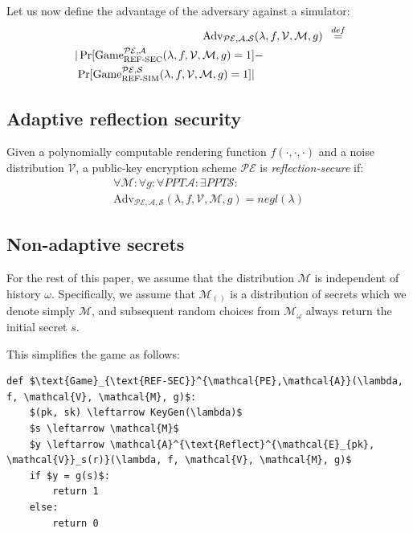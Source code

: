 \documentclass[conference, letterpaper, 10pt]{IEEEtran}
\newcommand\defeq{\stackrel{\mathclap{\normalfont\mbox{def}}}{=}}
\begin{document}
Let us now define the advantage of the adversary against a simulator:
\begin{align*}
    \text{Adv}_{\mathcal{PE}, \mathcal{A}, \mathcal{S}}&(\lambda, f, \mathcal{V}, \mathcal{M}, g) &\defeq\\
    |\Pr[\text{Game}_{\text{REF-SEC}}^{\mathcal{PE},\mathcal{A}}(\lambda, f, \mathcal{V}, \mathcal{M}, g) = 1] &-\\
    \Pr[\text{Game}_{\text{REF-SIM}}^{\mathcal{PE},\mathcal{S}}(\lambda, f, \mathcal{V}, \mathcal{M}, g) = 1]| &
\end{align*}

\subsection{Adaptive reflection security}\label{subsec:adaptiverefsec}

Given a polynomially computable rendering function $f(\cdot, \cdot, \cdot)$ and
a  noise distribution $\mathcal{V}$, a public-key encryption scheme
$\mathcal{PE}$ is \textit{reflection-secure} if:
\begin{align*}
\forall \mathcal{M}:
\forall g:
\forall PPT \mathcal{A}:
\exists PPT \mathcal{S}:\\
\text{Adv}_{\mathcal{PE}, \mathcal{A}, \mathcal{S}}(\lambda, f, \mathcal{V}, \mathcal{M}, g) = negl(\lambda)
\end{align*}

\subsection{Non-adaptive secrets}\label{subsec:refsecnonadapt}

For the rest of this paper, we assume that the distribution $\mathcal{M}$ is
independent of history $\omega$. Specifically, we assume that $\mathcal{M}_{()}$
is a distribution of secrets which we denote simply $\mathcal{M}$, and subsequent
random choices from $\mathcal{M}_\omega$ always return the initial secret $s$.

This simplifies the game as follows:

\begin{lstlisting}[texcl,mathescape,basicstyle=\small]
def $\text{Game}_{\text{REF-SEC}}^{\mathcal{PE},\mathcal{A}}(\lambda, f, \mathcal{V}, \mathcal{M}, g)$:
    $(pk, sk) \leftarrow KeyGen(\lambda)$
    $s \leftarrow \mathcal{M}$
    $y \leftarrow \mathcal{A}^{\text{Reflect}^{\mathcal{E}_{pk}, \mathcal{V}}_s(r)}(\lambda, f, \mathcal{V}, \mathcal{M}, g)$
    if $y = g(s)$:
        return 1
    else:
        return 0
\end{lstlisting}
\end{document}
